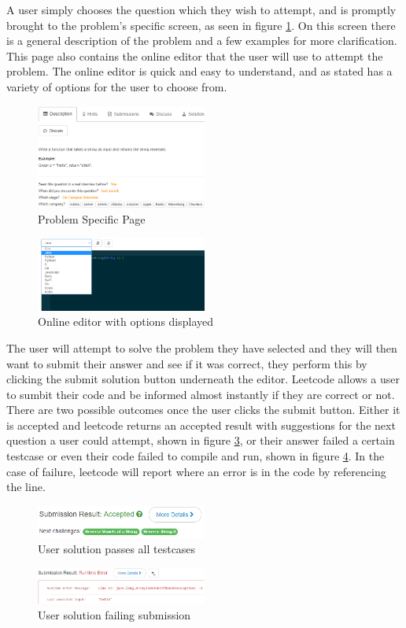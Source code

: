 \documentclass[10pt,twocolumn]{IEEEtran}
\begin{document}
A user simply chooses the question which they wish to attempt, and is promptly brought to the problem's specific screen, as seen in figure \ref{fig:problemPage}. On this screen there is a general description of the problem and a few examples for more clarification. This page also contains the online editor that the user will use to attempt the problem. The online editor is quick and easy to understand, and as stated has a variety of options for the user to choose from. 
\begin{figure}[h]
\includegraphics[width=0.5\textwidth]{problemPage.png}
\caption{Problem Specific Page}
\label{fig:problemPage}
\end{figure}

\begin{figure}[h]
\includegraphics[width=0.5\textwidth]{languageUI.png}
\caption{Online editor with options displayed}
\label{fig:langUI}
\end{figure}   
The user will attempt to solve the problem they have selected and they will then want to submit their answer and see if it was correct, they perform this by clicking the submit solution button underneath the editor. Leetcode allows a user to sumbit their code and be informed almost instantly if they are correct or not. There are two possible outcomes once the user clicks the submit button. Either it is accepted and leetcode returns an accepted result with suggestions for the next question a user could attempt, shown in figure \ref{fig:accepted}, or their answer failed a certain testcase or even their code failed to compile and run, shown in figure \ref{fig:fail}. In the case of failure, leetcode will report where an error is in the code by referencing the line.  
\begin{figure}[h]
\includegraphics[width=0.5\textwidth]{accepted.png}
\caption{User solution passes all testcases}
\label{fig:accepted}
\end{figure}  
\begin{figure}[h]
\includegraphics[width=0.5\textwidth]{failure.png}
\caption{User solution failing submission}
\label{fig:fail}
\end{figure}    
\end{document}
